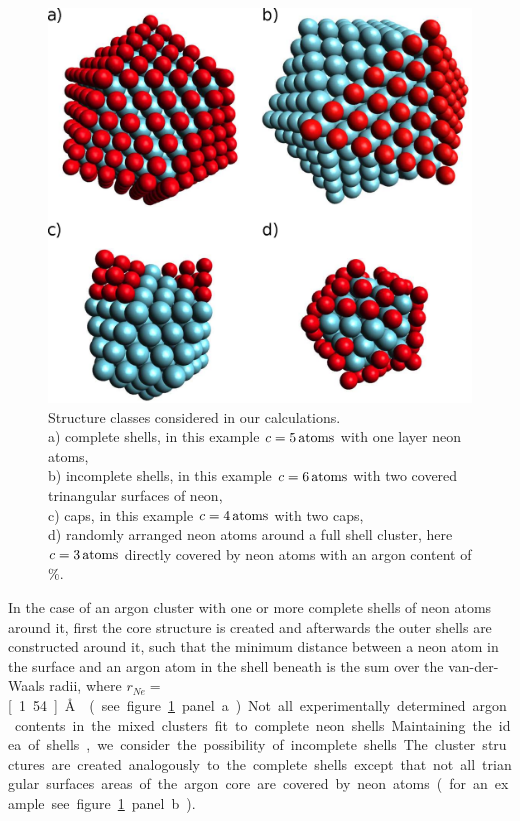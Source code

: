 \begin{figure}[h!]
 \centering
 \includegraphics[scale=0.9]{pics/NeAr_structures1.eps}
 \caption{Structure classes considered in our calculations.\\
          a) complete shells, in this example $c=\unit[5]{atoms}$ with one layer
          neon atoms,\\
          b) incomplete shells, in this example
          $c=\unit[6]{atoms}$ with two covered trinangular surfaces
          of neon,\\
          c) caps, in this example $c=\unit[4]{atoms}$ with two caps,\\
          d) randomly arranged neon atoms around a full shell cluster,
          here $c=\unit[3]{atoms}$ directly covered by neon atoms
          with an argon content of \unit[47]{\%}.}
 \label{figure:structures}
\end{figure}

In the case of an argon cluster with one or more complete shells of neon
atoms around it, first the core structure is created and afterwards the
outer shells are constructed around it, such that the minimum distance between a
neon atom in the surface and an argon atom in the shell beneath is the sum
over the van-der-Waals radii, where $r_{Ne}=$\unit[1.54]{\AA} \cite{Bondi64}
(see figure \ref{figure:structures} panel a).

Not all experimentally determined argon contents in the mixed clusters
fit to complete neon shells. Maintaining the idea of shells,
we consider the possibility of incomplete shells.
The cluster structures are created analogously to the
complete shells except that not all triangular surfaces areas of the argon core
are covered by neon atoms (for an example see figure \ref{figure:structures}
panel b).


